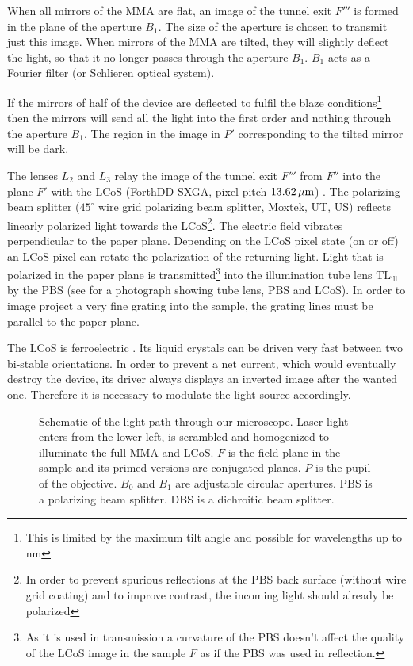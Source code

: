 When all mirrors of the MMA are flat, an image of the tunnel exit $F'''$
is formed in the plane of the aperture $B_1$. The size of the aperture
is chosen to transmit just this image. When mirrors of the MMA are
tilted, they will slightly deflect the light, so that it no longer
passes through the aperture $B_1$. $B_1$ acts as a Fourier filter (or
Schlieren optical system).

If the mirrors of half of the device are deflected to fulfil the blaze
conditions\footnote{This is limited by the maximum tilt angle and
  possible for wavelengths up to \unit[1000]{nm}} then the mirrors will
send all the light into the first order and nothing through the
aperture $B_1$.  The region in the image in $P'$ corresponding to the
tilted mirror will be dark.

The lenses $L_2$ and $L_3$ relay the image of the tunnel exit $F'''$
from $F''$ into the plane $F'$ with the LCoS (ForthDD SXGA, pixel
pitch $\unit[13.62]{\mu m}$) \citep{Cartwright2007}. The polarizing
beam splitter ($45^\circ$ wire grid polarizing beam splitter, Moxtek,
UT, US) reflects linearly polarized light towards the LCoS\footnote{In
  order to prevent spurious reflections at the PBS back surface
  (without wire grid coating) and to improve contrast, the incoming
  light should already be polarized}. The electric field vibrates
perpendicular to the paper plane. Depending on the LCoS pixel state
(on or off) an LCoS pixel can rotate the polarization of the returning
light. Light that is polarized in the paper plane is
transmitted\footnote{As it is used in transmission a curvature of the
  PBS doesn't affect the quality of the LCoS image in the sample $F$
  as if the PBS was used in reflection.}  into the illumination tube
lens $\textrm{TL}_\textrm{ill}$ by the PBS (see  for
a photograph showing tube lens, PBS and LCoS). In order to image
project a very fine grating into the sample, the grating lines must be
parallel to the paper plane.

The LCoS is ferroelectric \citetext{\citealp[see][]{1991Saleh} and
  \citealp[p.~192]{Goodman1996}}.  Its liquid crystals can be driven
very fast between two bi-stable orientations. In order to prevent a
net current, which would eventually destroy the device, its driver
always displays an inverted image after the wanted one. Therefore it
is necessary to modulate the light source accordingly.


\begin{figure}[H]
  \centering
  \def\svgscale{2}
  
  \caption{Schematic of the light path through our microscope. Laser
    light enters from the lower left, is scrambled and homogenized to
    illuminate the full MMA and LCoS. $F$ is the field plane in the
    sample and its primed versions are conjugated planes. $P$ is the
    pupil of the objective. $B_0$ and $B_1$ are adjustable circular
    apertures. PBS is a polarizing beam splitter. DBS is a dichroitic
    beam splitter.}
  \label{fig:memi-real}
\end{figure}



